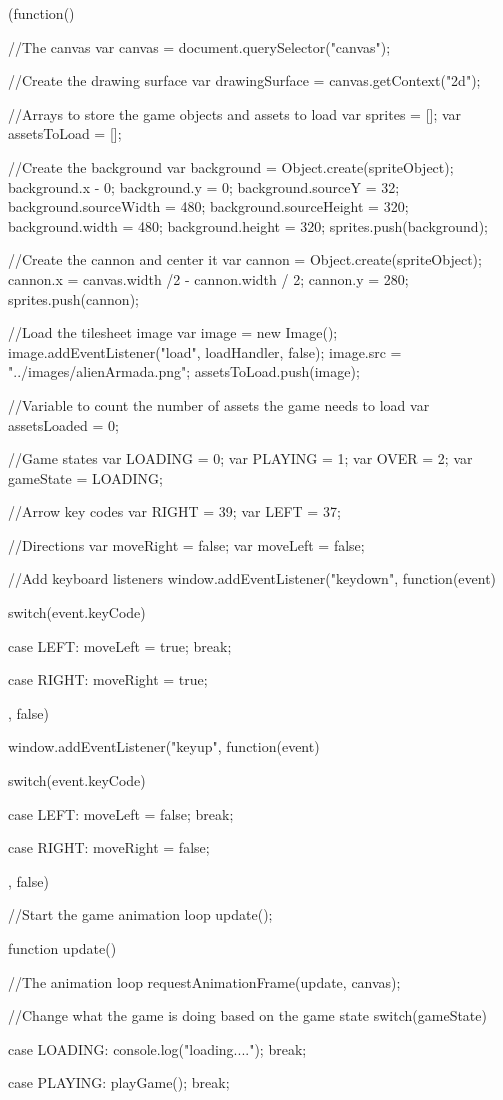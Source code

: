(function(){
	
	//The canvas
	var canvas = document.querySelector("canvas");
	
	//Create the drawing surface
	var drawingSurface = canvas.getContext("2d");
	
	//Arrays to store the game objects and assets to load
	var sprites = [];
	var assetsToLoad = [];
	
	//Create the background
	var background = Object.create(spriteObject);
	background.x - 0;
	background.y = 0;
	background.sourceY = 32;
	background.sourceWidth = 480;
	background.sourceHeight = 320;
	background.width = 480;
	background.height = 320;
	sprites.push(background);
	
	//Create the cannon and center it
	var cannon = Object.create(spriteObject);
	cannon.x = canvas.width /2 - cannon.width / 2;
	cannon.y = 280;
	sprites.push(cannon);
	
	//Load the tilesheet image
	var image = new Image();
	image.addEventListener("load", loadHandler, false);
	image.src = "../images/alienArmada.png";
	assetsToLoad.push(image);
	
	//Variable to count the number of assets the game needs to load
	var assetsLoaded = 0;
	
	//Game states
	var LOADING = 0;
	var PLAYING = 1;
	var OVER = 2;
	var gameState = LOADING;
	
	//Arrow key codes
	var RIGHT = 39;
	var LEFT = 37;
	
	//Directions
	var moveRight = false;
	var moveLeft = false;
	
	//Add keyboard listeners
	window.addEventListener("keydown", function(event)
	{
		switch(event.keyCode)
		{
			case LEFT:
				moveLeft = true;
				break;
			
			case RIGHT:
				moveRight = true;
		}
	}, false)
	
	window.addEventListener("keyup", function(event)
	{
		switch(event.keyCode)
		{
			case LEFT:
				moveLeft = false;
				break;
			
			case RIGHT:
				moveRight = false;
		}
	}, false)
	
	//Start the game animation loop
	update();
	
	function update()
	{
		//The animation loop
		requestAnimationFrame(update, canvas);
		
		//Change what the game is doing based on the game state
		switch(gameState)
		{
			case LOADING:
				console.log("loading....");
				break;
				
			case PLAYING:
				playGame();
				break;
				
}}}
